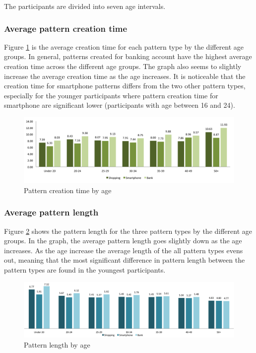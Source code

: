     The participants are divided into seven age intervals.

    \subsubsection{Average pattern creation time}
    Figure \ref{fig:patterncreationtimeage} is the average creation time for each pattern type by the different age groups. In general, patterns created for banking account have the highest average creation time across the different age groups. The graph also seems to slightly increase the average creation time as the age increases. It is noticeable that the creation time for smartphone patterns differs from the two other pattern types, especially for the younger participants where pattern creation time for smartphone are significant lower (participants with age between 16 and 24).

    \begin{figure}[H]
      \centering
      \includegraphics[width=\textwidth]{pics/analysis/creationtime-age.png}
      \caption{Pattern creation time by age}
      \label{fig:patterncreationtimeage}
    \end{figure}

    \clearpage
    \subsubsection{Average pattern length}
    Figure \ref{fig:patternlengthage} shows the pattern length for the three pattern types by the different age groups. In the graph, the average pattern length goes slightly down as the age increases. As the age increase the average length of the all pattern types evens out, meaning that the most significant difference in pattern length between the pattern types are found in the youngest participants.

  	\begin{figure}[H]
	    \centering
	    \includegraphics[width=\textwidth]{pics/analysis/avgpatternlength-age.png}
	    \caption{Pattern length by age}
	    \label{fig:patternlengthage}
  	\end{figure}

